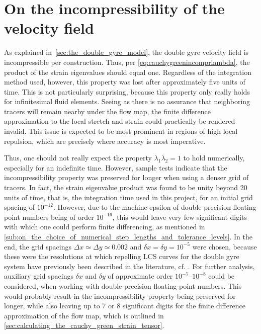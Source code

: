 \vspace{-0.5ex}
\section{On the incompressibility of the velocity field}
\label{sec:on_the_incompressibility_of_the_velocity_field}

As explained in~\cref{sec:the_double_gyre_model}, the double gyre velocity field
is incompressible per construction. Thus, per
\cref{eq:cauchygreenincomprlambda}, the product of the strain eigenvalues
should equal one. Regardless of the integration method used, however, this
property was lost after approximately five units of time. This is not
particularly surprising, because this property only really holds for
infinitesimal fluid elements. Seeing as there is no assurance that neighboring
tracers will remain nearby under the flow map, the finite difference
approximation to the local stretch and strain could practically be rendered
invalid. This issue is expected to be most prominent in regions of high local
repulsion, which are precisely where accuracy is most imperative.

Thus, one should not really expect the property $\lambda_{1}\lambda_{2}=1$ to
hold numerically, especially for an indefinite time. However, sample tests
indicate that the incompressibility property was preserved for longer when
using a denser grid of tracers. In fact, the strain eigenvalue product was
found to be unity beyond 20 units of time, that is, the integration time used in
this project, for an initial grid spacing of $10^{-12}$. However, due to the
machine epsilon of double-precision floating point numbers being of order
$10^{-16}$, this would leave very few significant digits with which one could
perform finite differencing, as mentioned in
\cref{sub:on_the_choice_of_numerical_step_lengths_and_tolerance_levels}.
In the end, the grid spacings $\Delta{x}\simeq\Delta{y}\simeq0.002$
and $\delta{x}=\delta{y}=10^{-5}$ were chosen, because these were the
resolutions at which repelling LCS curves for the double
gyre system have previously been described in the literature, cf.
\textcite{farazmand2012computing}. For further analysis, auxiliary grid spacings
$\delta{x}$ and $\delta{y}$ of approximate order $10^{-7}$--$10^{-8}$ could be
considered, when working with double-precision floating-point numbers. This
would probably result in the incompressibility property being preserved for
longer, while also leaving up to 7 or 8 significant digits for the finite
difference approximation of the flow map, which is outlined in
\cref{sec:calculating_the_cauchy_green_strain_tensor}.

